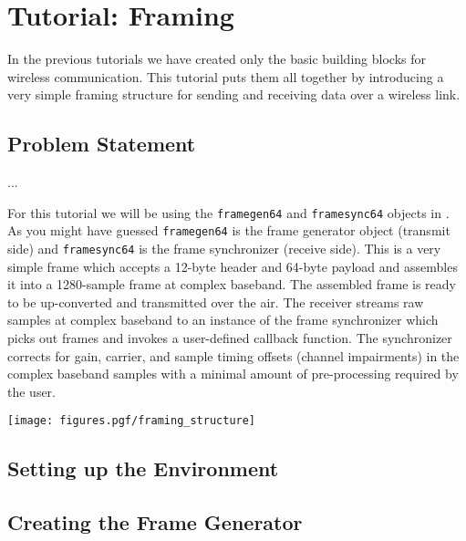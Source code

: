 % 
%

\newpage
\section{Tutorial: Framing}
\label{tutorial:framing}

In the previous tutorials we have created only the basic building blocks
for wireless communication.
This tutorial puts them all together by introducing a very simple
framing structure for sending and receiving data over a wireless link.


%
%
\subsection{Problem Statement}
\label{tutorial:framing:problem}

...

For this tutorial we will be using the {\tt framegen64} and
{\tt framesync64} objects in \liquid.
As you might have guessed {\tt framegen64} is the frame generator object
(transmit side)
and {\tt framesync64} is the frame synchronizer
(receive side).
This is a very simple frame which accepts a 12-byte header and 64-byte
payload and assembles it into a 1280-sample frame at complex baseband.
The assembled frame is ready to be up-converted and transmitted over the
air.
The receiver streams raw samples at complex baseband to an instance of
the frame synchronizer which picks out frames and invokes a user-defined
callback function.
The synchronizer corrects for gain, carrier, and sample timing offsets
(channel impairments) in the complex baseband samples with a minimal
amount of pre-processing required by the user.

\texttt{[image: figures.pgf/framing\_structure]}


%
%
\subsection{Setting up the Environment}
\label{tutorial:framing:environment}


%
%
\subsection{Creating the Frame Generator}
\label{tutorial:framing:framegen}


